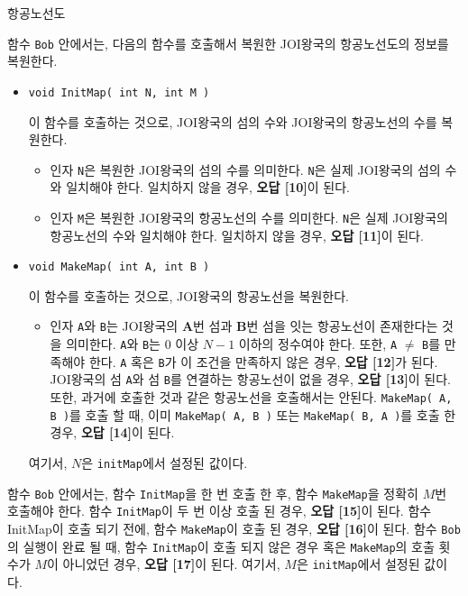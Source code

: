 \begin{problem}{항공노선도}
\begin{itemize}
	함수 \texttt{Bob} 안에서는, 다음의 함수를 호출해서 복원한 JOI왕국의 항공노선도의 정보를 복원한다.
	\begin{itemize}
		\item \texttt{void InitMap( int N, int M )}
		
		이 함수를 호출하는 것으로, JOI왕국의 섬의 수와 JOI왕국의 항공노선의 수를 복원한다.
		
		\begin{itemize}
			\item 인자 \texttt{N}은 복원한 JOI왕국의 섬의 수를 의미한다. \texttt{N}은 실제 JOI왕국의 섬의 수와 일치해야 한다. 일치하지 않을 경우, \textbf{오답 [10]}이 된다.
			\item 인자 \texttt{M}은 복원한 JOI왕국의 항공노선의 수를 의미한다. \texttt{N}은 실제 JOI왕국의 항공노선의 수와 일치해야 한다. 일치하지 않을 경우, \textbf{오답 [11]}이 된다. 
		\end{itemize}
		
		\item \texttt{void MakeMap( int A, int B )}
		
		이 함수를 호출하는 것으로, JOI왕국의 항공노선을 복원한다.
		
		\begin{itemize}
			
			\item 인자 \texttt{A}와 \texttt{B}는 JOI왕국의 \textbf{A}번 섬과 \textbf{B}번 섬을 잇는 항공노선이 존재한다는 것을 의미한다. \texttt{A}와 \texttt{B}는 0 이상 $N-1$ 이하의 정수여야 한다. 또한, \texttt{A} $\ne$ \texttt{B}를 만족해야 한다. \texttt{A} 혹은 \texttt{B}가 이 조건을 만족하지 않은 경우, \textbf{오답 [12]}가 된다. JOI왕국의 섬 \texttt{A}와 섬 \texttt{B}를 연결하는 항공노선이 없을 경우, \textbf{오답 [13]}이 된다. 또한, 과거에 호출한 것과 같은 항공노선을 호출해서는 안된다. \texttt{MakeMap( A, B )}를 호출 할 때, 이미 \texttt{MakeMap( A, B )} 또는 \texttt{MakeMap( B, A )}를 호출 한 경우, \textbf{오답 [14]}이 된다.
			
		\end{itemize}
		
		여기서, $N$은 \texttt{initMap}에서 설정된 값이다.
		
	\end{itemize}
		
	함수 \texttt{Bob} 안에서는, 함수 \texttt{InitMap}을 한 번 호출 한 후, 함수 \texttt{MakeMap}을 정확히 $M$번 호출해야 한다. 함수 \texttt{InitMap}이 두 번 이상 호출 된 경우, \textbf{오답 [15]}이 된다. 함수 InitMap이 호출 되기 전에, 함수 \texttt{MakeMap}이 호출 된 경우, \textbf{오답 [16]}이 된다. 함수 \texttt{Bob}의 실행이 완료 될 때, 함수 \texttt{InitMap}이 호출 되지 않은 경우 혹은 \texttt{MakeMap}의 호출 횟수가 $M$이 아니었던 경우, \textbf{오답 [17]}이 된다. 여기서, $M$은 \texttt{initMap}에서 설정된 값이다.
	

\end{itemize}
\end{problem}

